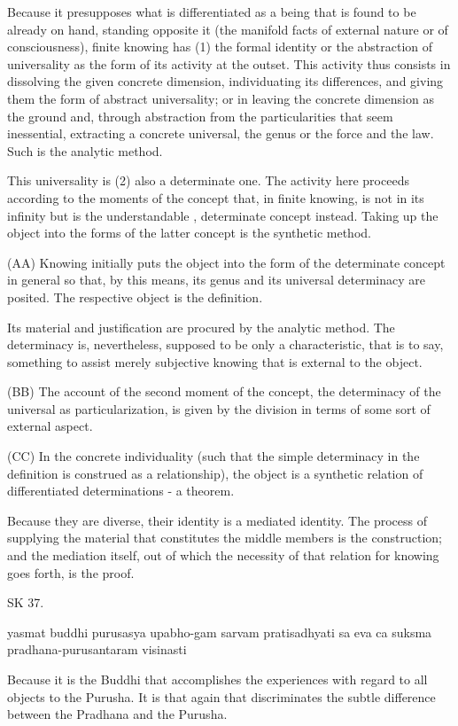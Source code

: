 Because it presupposes what is differentiated as a being that is
found to be already on hand, standing opposite it
(the manifold facts of external nature or of consciousness),
finite knowing has (1) the formal identity or
the abstraction of universality as the form of its activity at the outset.
This activity thus consists in dissolving the given concrete dimension,
individuating its differences, and giving them the form of abstract universality;
or in leaving the concrete dimension as the ground and,
through abstraction from the particularities that seem inessential,
extracting a concrete universal, the genus or the force and the law.
Such is the analytic method.

This universality is (2) also a determinate one.
The activity here proceeds according to the moments of
the concept that, in finite knowing, is not in its infinity
but is the understandable , determinate concept instead.
Taking up the object into the forms of
the latter concept is the synthetic method.

(AA) Knowing initially puts the object into the form of
the determinate concept in general so that, by this means,
its genus and its universal determinacy are posited.
The respective object is the definition.

Its material and justification are procured by the analytic method.
The determinacy is, nevertheless, supposed to be only a characteristic,
that is to say, something to assist merely subjective knowing
that is external to the object.

(BB) The account of the second moment of the concept,
the determinacy of the universal as particularization,
is given by the division in terms of some sort of external aspect.

(CC) In the concrete individuality (such that the simple determinacy in
the definition is construed as a relationship),
the object is a synthetic relation of differentiated determinations - a theorem.

Because they are diverse, their identity is a mediated identity.
The process of supplying the material that constitutes
the middle members is the construction;
and the mediation itself, out of which the necessity of
that relation for knowing goes forth, is the proof.

SK 37.

yasmat buddhi purusasya upabho-gam sarvam pratisadhyati
sa eva ca suksma pradhana-purusantaram visinasti

Because it is the Buddhi that accomplishes the experiences
with regard to all objects to the Purusha.
It is that again that discriminates the subtle difference
between the Pradhana and the Purusha.

